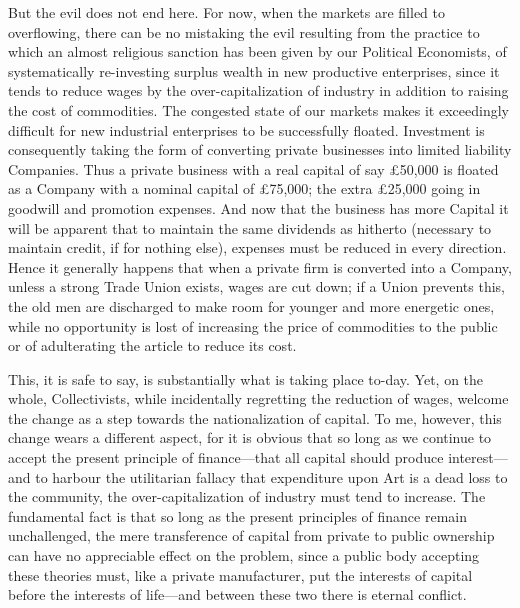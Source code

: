 \documentclass{book}
\begin{document}
But the evil does not end here. For now, when the markets are filled to overflowing, there can be no mistaking the evil resulting from the practice to which an almost religious sanction has been given by our Political Economists, of systematically re-investing surplus wealth in new productive enterprises, since it tends to reduce wages by the over-capitalization of industry in addition to raising the cost of commodities. The congested state of our markets makes it exceedingly difficult for new industrial enterprises to be successfully floated. Investment is consequently taking the form of converting private businesses into limited liability Companies. Thus a private business with a real capital of say £50,000 is floated as a Company with a nominal capital of £75,000; the extra £25,000 going in goodwill and promotion expenses. And now that the business has more Capital it will be apparent that to maintain the same dividends as hitherto (necessary to maintain credit, if for nothing else), expenses must be reduced in every direction. Hence it generally happens that when a private firm is converted into a Company, unless a strong Trade Union exists, wages are cut down; if a Union prevents this, the old men are discharged to make room for younger and more energetic ones, while no opportunity is lost of increasing the price of commodities to the public or of adulterating the article to reduce its cost.

This, it is safe to say, is substantially what is taking place to-day. Yet, on the whole, Collectivists, while incidentally regretting the reduction of wages, welcome the change as a step towards the nationalization of capital. To me, however, this change wears a different aspect, for it is obvious that so long as we continue to accept the present principle of finance—that all capital should produce interest—and to harbour the utilitarian fallacy that expenditure upon Art is a dead loss to the community, the over-capitalization of industry must tend to increase. The fundamental fact is that so long as the present principles of finance remain unchallenged, the mere transference of capital from private to public ownership can have no appreciable effect on the problem, since a public body accepting these theories must, like a private manufacturer, put the interests of capital before the interests of life—and between these two there is eternal conflict.
\end{document}
